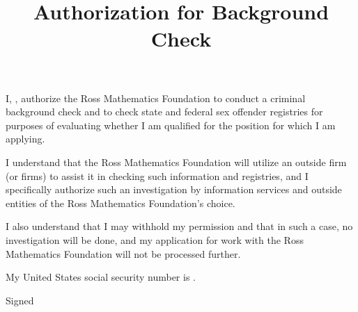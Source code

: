\documentclass{ross}
\title{Authorization for Background Check}
\begin{document}
\maketitle

I, , authorize the Ross Mathematics Foundation
to conduct a criminal background check and to check state and federal
sex offender registries for purposes of evaluating whether I am
qualified for the position for which I am applying.

I understand that the Ross Mathematics Foundation will utilize an
outside firm (or firms) to assist it in checking such information and
registries, and I specifically authorize such an investigation by
information services and outside entities of the Ross Mathematics
Foundation's choice.

I also understand that I may withhold my permission and that in such a
case, no investigation will be done, and my application for work with
the Ross Mathematics Foundation will not be processed further.

My United States social security number is .

\vspace{0.75in}
\hfill Signed \underline{\hspace{3in}}
\quad{}
\end{document}
